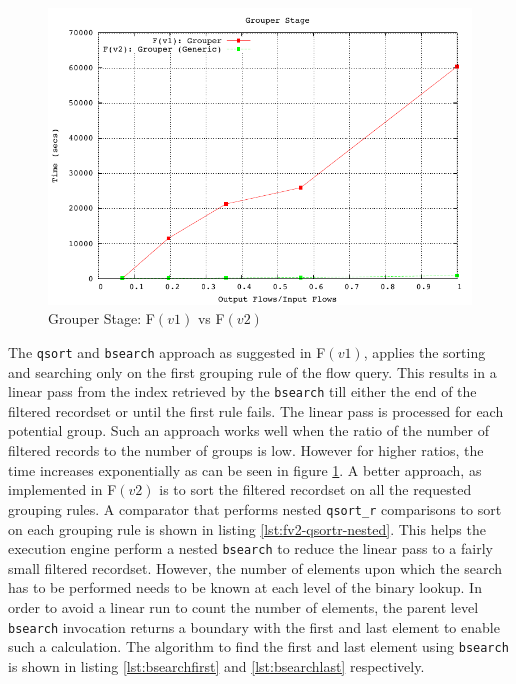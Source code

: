 \begin{figure}[ht!]
  \begin{center}
    \includegraphics*
    [width=0.8\linewidth]{figures/benchmarks/grouper-fv1-fv2-bsearch}
    \caption{Grouper Stage: F$(v1)$ vs F$(v2)$}
    \label{fig:fv1-fv2-grouper-bsearch}
  \end{center}
\end{figure}

The \texttt{qsort} and \texttt{bsearch} approach as suggested in F$(v1)$,
applies the sorting and searching only on the first grouping rule of the flow
query. This results in a linear pass from the index retrieved by the
\texttt{bsearch} till either the end of the filtered recordset or until the
first rule fails. The linear pass is processed for each potential group. Such
an approach works well when  the
ratio of the number of filtered records to the number of groups is low.
However for higher ratios, the time increases exponentially as can be seen in
figure \ref{fig:fv1-fv2-grouper-bsearch}. A better approach, as implemented in
F$(v2)$ is to sort the filtered recordset on all the requested grouping rules.
A comparator that performs nested \texttt{qsort\_r} comparisons to sort on
each grouping rule is shown in listing \ref{lst:fv2-qsortr-nested}. This helps
the execution engine perform a nested \texttt{bsearch} to reduce the linear
pass to a fairly small filtered recordset. However, the number of elements
upon which the search has to be performed needs to be known at each level of
the binary lookup. In order to avoid a linear run to count the number of
elements, the parent level \texttt{bsearch} invocation returns a boundary with
the first and last element to enable such a calculation. The algorithm to find
the first and last element using \texttt{bsearch} is shown in listing
\ref{lst:bsearchfirst} and \ref{lst:bsearchlast} respectively.


